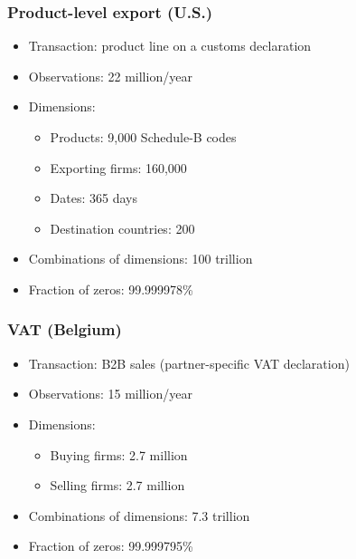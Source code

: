 \documentclass[compress,mathserif]{beamer}
\begin{document}
\begin{frame}\frametitle{Product-level export (U.S.)}\hypertarget{Product-level export (U.S.)}{}
\begin{itemize}
\item Transaction: product line on a customs declaration

\item Observations: 22 million/year

\item Dimensions:
\begin{itemize}
\item Products: 9,000 Schedule-B codes

\item Exporting firms: 160,000

\item Dates: 365 days

\item Destination countries: 200
\end{itemize}

\item Combinations of dimensions: 100 trillion

\item Fraction of zeros: 99.999978\%


\end{itemize}
\end{frame}



\begin{frame}\frametitle{VAT (Belgium)}\hypertarget{VAT (Belgium)}{}
\begin{itemize}
\item Transaction: B2B sales (partner-specific VAT declaration)

\item Observations: 15 million/year

\item Dimensions:
\begin{itemize}
\item Buying firms: 2.7 million

\item Selling firms: 2.7 million
\end{itemize}

\item Combinations of dimensions: 7.3 trillion

\item Fraction of zeros: 99.999795\%


\end{itemize}
\end{frame}
\end{document}
